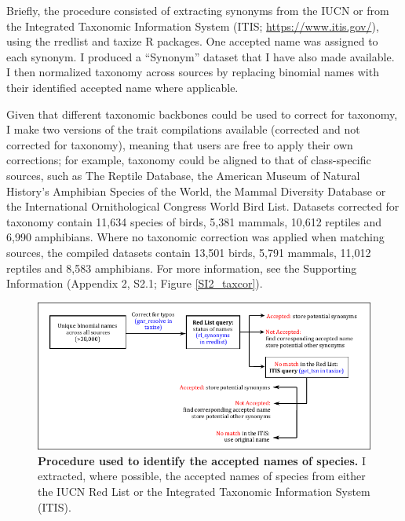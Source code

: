 Briefly, the procedure consisted of extracting synonyms from the IUCN \citep{IUCN2020} or from the Integrated Taxonomic Information System (ITIS; \url{https://www.itis.gov/}), using the rredlist \citep{rredlist} and taxize \citep{Chamberlain2013} R packages. One accepted name was assigned to each synonym. I produced a “Synonym” dataset that I have also made available. I then normalized taxonomy across sources by replacing binomial names with their identified accepted name where applicable.

Given that different taxonomic backbones could be used to correct for taxonomy, I make two versions of the trait compilations available (corrected and not corrected for taxonomy), meaning that users are free to apply their own corrections; for example, taxonomy could be aligned to that of class-specific sources, such as The Reptile Database, the American Museum of Natural History’s Amphibian Species of the World, the Mammal Diversity Database or the International Ornithological Congress World Bird List. Datasets corrected for taxonomy contain 11,634 species of birds, 5,381 mammals, 10,612 reptiles and 6,990 amphibians. Where no taxonomic correction was applied when matching sources, the compiled datasets contain 13,501 birds, 5,791 mammals, 11,012 reptiles and 8,583 amphibians. For more information, see the Supporting Information (Appendix 2, S2.1; Figure \ref{SI2_taxcor}).

\vskip 1cm
\begin{figure}[h!]
\centering
\includegraphics[scale=1.4]{figures/Chapter1/Taxonomic_corrections_chart}
\caption[Procedure used to identify the accepted names of species.]{\textbf{Procedure used to identify the accepted names of species.} I extracted, where possible, the accepted names of species from either the IUCN Red List or the Integrated Taxonomic Information System (ITIS).}
\label{chart_taxcor}
\end{figure}


